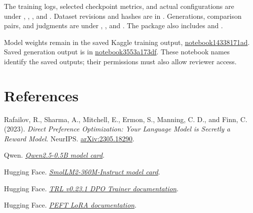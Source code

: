 \documentclass[11pt,a4paper]{article}
\begin{document}
The training logs, selected checkpoint metrics, and actual configurations are under , , , and . Dataset revisions and hashes are in . Generations, comparison pairs, and judgments are under , , and . The package also includes  and .

Model weights remain in the saved Kaggle training output, \href{https://www.kaggle.com/code/riazshaheer/notebook14338171ad}{notebook14338171ad}. Saved generation output is in \href{https://www.kaggle.com/code/riazshaheer/notebook3553a173df}{notebook3553a173df}. These notebook names identify the saved outputs; their permissions must also allow reviewer access.

\section*{References}
\begin{enumerate}[label={[\arabic*]}]
\small
\item Rafailov, R., Sharma, A., Mitchell, E., Ermon, S., Manning, C. D., and Finn, C. (2023). \textit{Direct Preference Optimization: Your Language Model is Secretly a Reward Model}. NeurIPS. \href{https://arxiv.org/abs/2305.18290}{arXiv:2305.18290}.
\item Qwen. \href{https://huggingface.co/Qwen/Qwen2.5-0.5B}{\textit{Qwen2.5-0.5B model card}}.
\item Hugging Face. \href{https://huggingface.co/HuggingFaceTB/SmolLM2-360M-Instruct}{\textit{SmolLM2-360M-Instruct model card}}.
\item Hugging Face. \href{https://huggingface.co/docs/trl/v0.23.1/en/dpo_trainer}{\textit{TRL v0.23.1 DPO Trainer documentation}}.
\item Hugging Face. \href{https://huggingface.co/docs/peft/v0.17.0/en/package_reference/lora}{\textit{PEFT LoRA documentation}}.
\end{enumerate}
\end{document}
